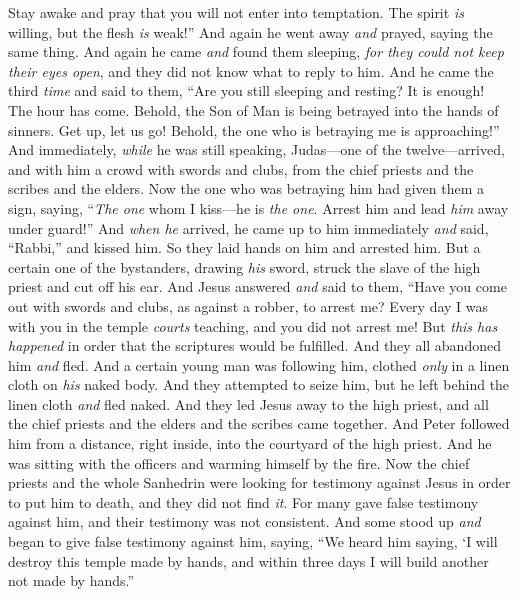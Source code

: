 \begin{biblechapter}
\verse Stay awake and pray that you will not enter into temptation. The spirit \textit{is} willing, but the flesh \textit{is} weak!”
\verse And again he went away \textit{and} prayed, saying the same thing.
\verse And again he came \textit{and} found them sleeping, \textit{for they could not keep their eyes open}, and they did not know what to reply to him.
\verse And he came the third \textit{time} and said to them, “Are you still sleeping and resting? It is enough! The hour has come. Behold, the Son of Man is being betrayed into the hands of sinners.
\verse Get up, let us go! Behold, the one who is betraying me is approaching!”
 And immediately, \textit{while} he was still speaking, Judas—one of the twelve—arrived, and with him a crowd with swords and clubs, from the chief priests and the scribes and the elders.
\verse Now the one who was betraying him had given them a sign, saying, “\textit{The one} whom I kiss—he is \textit{the one}. Arrest him and lead \textit{him} away under guard!”
\verse And \textit{when he} arrived, he came up to him immediately \textit{and} said, “Rabbi,” and kissed him.
\verse So they laid hands on him and arrested him.
\verse But a certain one of the bystanders, drawing \textit{his} sword, struck the slave of the high priest and cut off his ear.
\verse And Jesus answered \textit{and} said to them, “Have you come out with swords and clubs, as against a robber, to arrest me?
\verse Every day I was with you in the temple \textit{courts} teaching, and you did not arrest me! But \textit{this has happened} in order that the scriptures would be fulfilled.
\verse And they all abandoned him \textit{and} fled.
\verse And a certain young man was following him, clothed \textit{only} in a linen cloth on \textit{his} naked body. And they attempted to seize him,
\verse but he left behind the linen cloth \textit{and} fled naked.
 And they led Jesus away to the high priest, and all the chief priests and the elders and the scribes came together.
\verse And Peter followed him from a distance, right inside, into the courtyard of the high priest. And he was sitting with the officers and warming himself by the fire.
\verse Now the chief priests and the whole Sanhedrin were looking for testimony against Jesus in order to put him to death, and they did not find \textit{it}.
\verse For many gave false testimony against him, and their testimony was not consistent.
\verse And some stood up \textit{and} began to give false testimony against him, saying,
\verse “We heard him saying, ‘I will destroy this temple made by hands, and within three days I will build another not made by hands.”

\end{biblechapter}

